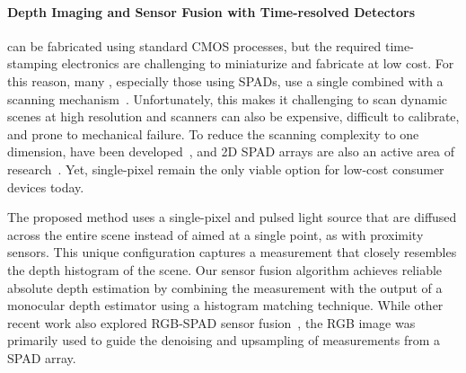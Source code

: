 \paragraph{Depth Imaging and Sensor Fusion with Time-resolved Detectors}
%
 can be
fabricated using standard CMOS processes, but the required time-stamping electronics are challenging to miniaturize and fabricate at low
cost. For this reason, many , especially those using SPADs, use a single 
combined with a  scanning
mechanism~\cite{Kirmani:2014,Lamb2010,Li:2019,pawlikowska2017single,gupta2019photonflooded}.
Unfortunately, this makes it challenging to scan dynamic scenes at high
resolution and scanners can also be expensive, difficult to calibrate, and prone
to mechanical failure. To reduce the scanning complexity to one dimension,  have been
developed~\cite{burri2017linospad,burri2016linospad,OToole2017}, and 2D SPAD arrays are also an active area of
research~\cite{Niclass2005,Stoppa2007,Veerappan2011,Zhang2018}. Yet,
single-pixel  remain the only viable option for low-cost consumer devices
today.


The proposed method uses a single-pixel  and pulsed light source that are
diffused across the entire scene instead of aimed at a single point, as with
proximity sensors. This unique configuration captures a measurement that closely
resembles the depth histogram of the scene. Our sensor fusion algorithm achieves
reliable absolute depth estimation by combining the  measurement with the
output of a monocular depth estimator using a histogram matching technique.
While other recent work also explored RGB-SPAD sensor fusion~\cite{Lindell2018},
the RGB image was primarily used to guide the denoising and upsampling of
measurements from a SPAD array.

 


